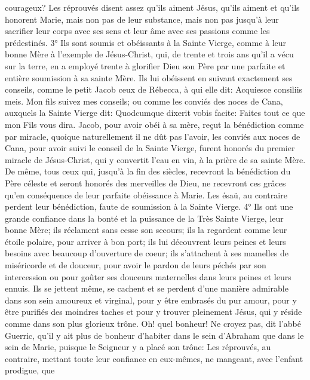 courageux?
Les réprouvés disent assez qu'ils aiment Jésus, qu'ils aiment et qu'ils honorent Marie, mais non pas de leur
substance, mais non pas jusqu'à leur sacrifier leur corps avec ses sens et leur âme avec ses passions comme les
prédestinés.
 3° Ils sont soumis et obéissants à la Sainte Vierge, comme à leur bonne Mère à l'exemple de Jésus-Christ,
qui, de trente et trois ans qu'il a vécu sur la terre, en a employé trente à glorifier Dieu son Père par une parfaite et
entière soumission à sa sainte Mère. Ils lui obéissent en suivant exactement ses conseils, comme le petit Jacob
ceux de Rébecca, à qui elle dit: Acquiesce consiliis meis. Mon fils suivez mes conseils; ou comme les conviés des
noces de Cana, auxquels la Sainte Vierge dit: Quodcumque dixerit vobis facite: Faites tout ce que mon Fils vous
dira. Jacob, pour avoir obéi à sa mère, reçut la bénédiction comme par miracle, quoique naturellement il ne dût pas
l'avoir, les conviés aux noces de Cana, pour avoir suivi le conseil de la Sainte Vierge, furent honorés du premier
miracle de Jésus-Christ, qui y convertit l'eau en vin, à la prière de sa sainte Mère. De même, tous ceux qui, jusqu'à
la fin des siècles, recevront la bénédiction du Père céleste et seront honorés des merveilles de Dieu, ne recevront
ces grâces qu'en conséquence de leur parfaite obéissance à Marie. Les ésaü, au contraire perdent leur
bénédiction, faute de soumission à la Sainte Vierge.
 4° Ils ont une grande confiance dans la bonté et la puissance de la Très Sainte Vierge, leur bonne Mère; ils
réclament sans cesse son secours; ils la regardent comme leur étoile polaire, pour arriver à bon port; ils lui
découvrent leurs peines et leurs besoins avec beaucoup d'ouverture de coeur; ils s'attachent à ses mamelles de
miséricorde et de douceur, pour avoir le pardon de leurs péchés par son intercession ou pour goûter ses douceurs
maternelles dans leurs peines et leurs ennuis. Ils se jettent même, se cachent et se perdent d'une manière
admirable dans son sein amoureux et virginal, pour y être embrasés du pur amour, pour y être purifiés des
moindres taches et pour y trouver pleinement Jésus, qui y réside comme dans son plus glorieux trône. Oh! quel
bonheur! Ne croyez pas, dit l'abbé Guerric, qu'il y ait plus de bonheur d'habiter dans le sein d'Abraham que dans le
sein de Marie, puisque le Seigneur y a placé son trône: 
Les réprouvés, au contraire, mettant toute leur confiance en eux-mêmes, ne mangeant, avec l'enfant prodigue, que
